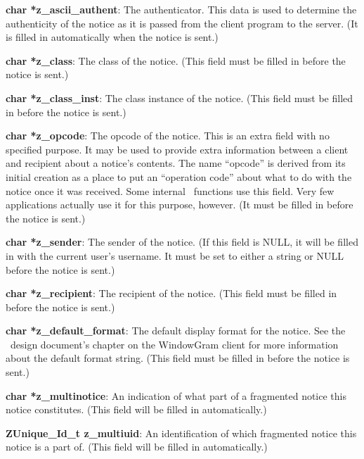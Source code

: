 \begin{description}
\item {\bf char *z_ascii_authent}: The authenticator.  This data is
used to determine the authenticity of the notice as it is passed from
the client program to the server.  (It is filled in automatically when
the notice is sent.)

\item {\bf char *z_class}: The class of the notice.  (This field must be
filled in before the notice is sent.)

\item {\bf char *z_class_inst}: The class instance of the notice.  (This
field must be filled in before the notice is sent.)

\item {\bf char *z_opcode}: The opcode of the notice.  This is an extra
field with no specified purpose.  It may be used to provide extra
information between a client and recipient about a notice's contents.
The name ``opcode'' is derived from its initial creation as a place to
put an ``operation code'' about what to do with the notice once it was
received.  Some internal \Zephyr\ functions use this field.
Very few applications actually use it for this purpose,
however.  (It must be filled in before the notice is sent.)

\item {\bf char *z_sender}: The sender of the notice.  (If this field is
NULL, it will be filled in with the current user's username.  It must
be set to either a string or NULL before the notice is sent.)

\item {\bf char *z_recipient}: The recipient of the notice.  (This field
must be filled in before the notice is sent.)

\item {\bf char *z_default_format}: The default display format for the
notice.  See the \Zephyr\ design document's chapter on the WindowGram
client for more information about the default format string.  (This
field must be filled in before the notice is sent.)

\item {\bf char *z_multinotice}: An indication of what part of a
fragmented notice this notice constitutes.  (This field will be
filled in automatically.)

\item {\bf ZUnique_Id_t z_multiuid}: An identification of which
fragmented notice this notice is a part of.  (This field will be
filled in automatically.)


\end{description}
